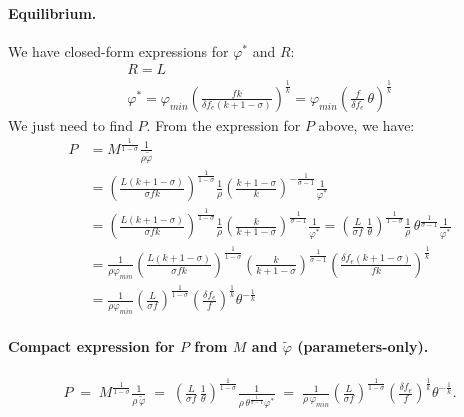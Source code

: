 \begin{solution}
\paragraph{Equilibrium.} We have closed-form expressions for $\varphi^*$ and $R$:
\begin{align*}
    R = L\\
    \varphi^* = \varphi_{min} \left(\frac{fk}{\delta f_e (k + 1 - \sigma)}\right)^{\frac{1}{k}} = \varphi_{min} \left( \frac{f}{\delta f_e}\, \theta \right)^{\frac{1}{k}}
\end{align*}
We just need to find $P$. From the expression for $P$ above, we have:
\begin{align*}
    P &= M^{\frac{1}{1 - \sigma}} \frac{1}{\rho \tilde{\varphi}}\\
    &= \left( \frac{L (k + 1 - \sigma)}{\sigma f k} \right)^{\frac{1}{1 - \sigma}} \frac{1}{\rho} \left( \frac{k + 1 - \sigma}{k} \right)^{-\frac{1}{\sigma - 1}} \frac{1}{\varphi^*} \\
    &= \left( \frac{L (k + 1 - \sigma)}{\sigma f k} \right)^{\frac{1}{1 - \sigma}} \frac{1}{\rho} \left( \frac{k}{k + 1 - \sigma} \right)^{\frac{1}{\sigma - 1}} \frac{1}{\varphi^*} = \left( \frac{L}{\sigma f}\,\frac{1}{\theta} \right)^{\frac{1}{1 - \sigma}} \frac{1}{\rho}\, \theta^{\frac{1}{\sigma - 1}} \frac{1}{\varphi^*} \\
    &= \frac{1}{\rho \varphi_{min}} \left( \frac{L (k + 1 - \sigma)}{\sigma f k} \right)^{\frac{1}{1 - \sigma}} \left( \frac{k}{k + 1 - \sigma} \right)^{\frac{1}{\sigma - 1}} \left(\frac{\delta f_e (k + 1 - \sigma)}{fk}\right)^{\frac{1}{k}} \\
    &= \frac{1}{\rho \varphi_{min}} \left( \frac{L}{\sigma f} \right)^{\frac{1}{1 - \sigma}} \left( \frac{\delta f_e}{f} \right)^{\frac{1}{k}} \theta^{-\frac{1}{k}}
\end{align*}

\paragraph{Compact expression for $P$ from $M$ and $\tilde{\varphi}$ (parameters-only).}
\begin{align*}
    P \;=\; M^{\frac{1}{1-\sigma}}\frac{1}{\rho\,\tilde{\varphi}}
    \;=\; \left(\frac{L}{\sigma f}\,\frac{1}{\theta}\right)^{\frac{1}{1-\sigma}} \frac{1}{\rho\, \theta^{\frac{1}{\sigma-1}}\varphi^*}
    \;=\; \frac{1}{\rho\,\varphi_{min}}\left(\frac{L}{\sigma f}\right)^{\frac{1}{1-\sigma}}\left(\frac{\delta f_e}{f}\right)^{\frac{1}{k}}\theta^{-\frac{1}{k}}.
\end{align*}
\end{solution}